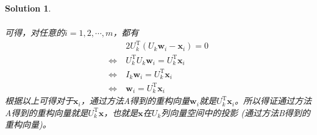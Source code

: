 \documentclass[a4paper,UTF8]{article}
\numberwithin{equation}{section}
\newtheorem*{mySol}{Solution}
\begin{document}
\begin{mySol}
\begin{enumerate}[(1)]
\begin{equation}
\begin{aligned}
\end{aligned}
\end{equation}
可得，对任意的$i=1,2,\cdots,m$，都有
\begin{equation}
\begin{aligned}
&2U_k^\mathrm{T}(U_k\mathbf{w}_i - \mathbf{x}_i)=0\\
\Leftrightarrow\ &U_k^\mathrm{T}U_k\mathbf{w}_i = U_k^\mathrm{T}\mathbf{x}_i\\
\Leftrightarrow\ &I_k\mathbf{w}_i = U_k^\mathrm{T}\mathbf{x}_i\\
\Leftrightarrow\ &\mathbf{w}_i = U_k^\mathrm{T}\mathbf{x}_i
\end{aligned}
\end{equation}
根据以上可得对于$\mathbf{x}_i$，通过方法A得到的重构向量$\mathbf{w}_i$就是$U_k^\mathrm{T}\mathbf{x}_i$。所以得证通过方法A得到的重构向量就是$U_k^\mathrm{T}\mathbf{x}$，也就是$\mathbf{x}$在$U_k$列向量空间中的投影 (通过方法B得到的重构向量)。
\end{enumerate}
\end{mySol}
\end{document}
